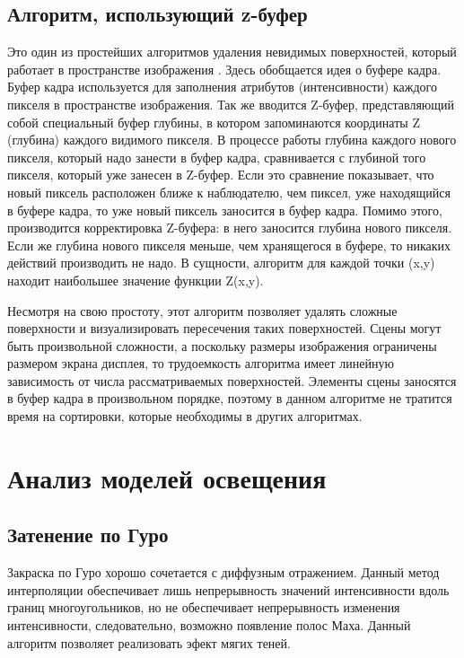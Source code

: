 \subsection{Алгоритм, использующий z-буфер}
Это один из простейших алгоритмов удаления невидимых поверхностей, который работает в пространстве изображения \cite{z-buffer}. Здесь обобщается идея о буфере кадра. Буфер кадра используется для заполнения атрибутов (интенсивности) каждого пикселя в пространстве изображения. Так же вводится Z-буфер, представляющий собой специальный буфер глубины, в котором запоминаются координаты Z (глубина) каждого видимого пикселя. В процессе работы глубина каждого нового пикселя, который надо занести в буфер кадра, сравнивается с глубиной того пикселя, который уже занесен в Z-буфер. Если это сравнение показывает, что новый пиксель расположен ближе к наблюдателю, чем пиксел, уже находящийся в буфере кадра, то уже новый пиксель заносится в буфер кадра. Помимо этого, производится корректировка Z-буфера: в него заносится глубина нового пикселя. Если же глубина нового пикселя меньше, чем хранящегося в буфере, то никаких действий производить не надо. В сущности, алгоритм для каждой точки (x,y) находит наибольшее значение функции Z(x,y).

Несмотря на свою простоту, этот алгоритм позволяет удалять сложные поверхности и визуализировать пересечения таких поверхностей. Сцены могут быть произвольной сложности, а поскольку размеры изображения ограничены размером экрана дисплея, то трудоемкость алгоритма имеет линейную зависимость от числа рассматриваемых поверхностей. Элементы сцены заносятся в буфер кадра в произвольном порядке, поэтому в данном алгоритме не тратится время на сортировки, которые необходимы в других алгоритмах.

\section{Анализ моделей освещения}

\subsection{Затенение по Гуро}
Закраска по Гуро \cite{guro} хорошо сочетается с диффузным отражением. Данный метод интерполяции обеспечивает лишь непрерывность значений интенсивности вдоль границ многоугольников, но не обеспечивает непрерывность изменения интенсивности, следовательно, возможно появление полос Маха. Данный алгоритм позволяет реализовать эфект мягих теней.

